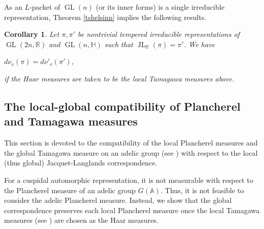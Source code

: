 \documentclass[11pt]{article}
\theoremstyle{plain}
\newtheorem{corollary}[theorem]{Corollary}
\theoremstyle{remark}
\theoremstyle{definition}
\DeclareMathOperator{\GL}{GL}
\DeclareMathOperator{\JL}{JL}
\begin{document}
As an $L$-packet of $\GL(n)$ (or its inner forms) is a single irreducible representation, Theorem \ref{tshelsinn} implies the following results. 
\begin{corollary}\label{cratioRPd}
Let $\pi,\pi'$ be nontrivial tempered irreducible representations of $\GL(2n,\mathbb{R})$ and $\GL(n,\mathbb{H})$ such that $\JL_{\mathbb{R}}(\pi)=\pi'$.
We have
\begin{center}
    $d \nu_v (\pi)=d \nu'_v(\pi')$,
\end{center}
if the Haar measures are taken to be the local Tamagawa measures above.   
\end{corollary}



\subsection{The local-global compatibility of Plancherel and Tamagawa measures}\label{scomp}

This section is devoted to the compatibility of the local Plancherel measures and the global Tamagawa measure on an adelic group (see \cite{Kott88}) with respect to the local (thus global) Jacquet-Langlands correspondence. 
 
 
For a cuspidal automorphic representation, it is not measurable with respect to the Plancherel measure of an adelic group $G(\mathbb{A})$.
Thus, it is not feasible to consider the adelic Plancherel measure. 
Instead, we show that the global correspondence preserves each local Plancherel measure once the local Tamagawa measures (see \cite[\S 29]{Voight21}) are chosen as the Haar measures. 
\end{document}
